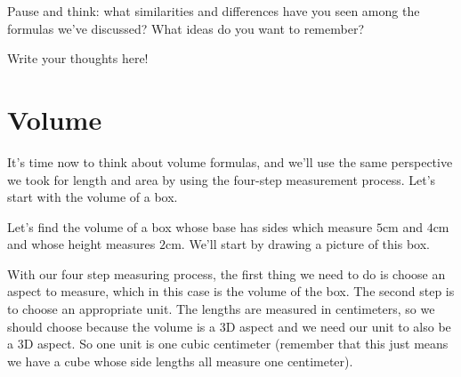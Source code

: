 \documentclass{ximera}
\begin{document}
\begin{question}
Pause and think: what similarities and differences have you seen among the formulas we've discussed? What ideas do you want to remember?
\begin{freeResponse}
Write your thoughts here!
\end{freeResponse}
\end{question}


\section{Volume}

It's time now to think about volume formulas, and we'll use the same perspective we took for length and area by using the four-step measurement process. Let's start with the volume of a box.
\begin{example}
Let's find the volume of a box whose base has sides which measure $5$cm and $4$cm and whose height measures $2$cm. We'll start by drawing a picture of this box.
\begin{image}
\end{image}
With our four step measuring process, the first thing we need to do is choose an aspect to measure, which in this case is the volume of the box. The second step is to choose an appropriate unit. The lengths are measured in centimeters, so we should choose  because the volume is a 3D aspect and we need our unit to also be a 3D aspect. So one unit is one cubic centimeter (remember that this just means we have a cube whose side lengths all measure one centimeter).


\end{example}
\end{document}
